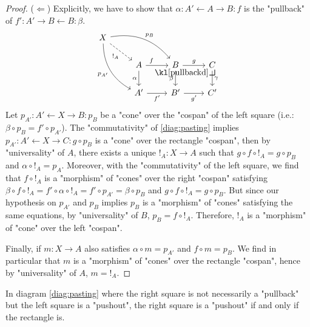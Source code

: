 \documentclass[main.tex]{subfiles}
\begin{document}
\begin{proof}
    ($\Leftarrow$) Explicitly, we have to show that $\alpha: A' \leftarrow A \rightarrow B: f$ is the "pullback" of $f': A' \rightarrow B \leftarrow B: \beta$. 
    \begin{equation}
    \begin{tikzcd}
X \arrow[rdd, "p_{A'}"', bend right] \arrow[rd, "{!}_A"', dashed] \arrow[rrd, "p_B", bend left] &                     &                                            &            \\
                                               & A \arrow[r, "f", near start] \arrow[d, "\alpha"'] & B \arrow[r, "g"] \arrow[d, "\beta"'] \arrow[rd, "\pullbackd", phantom, very near start] & C \arrow[d, "\gamma"] \\
                                               & A' \arrow[r, "f'"']                & B' \arrow[r, "g'"']                                  & C'          
\end{tikzcd}
    \end{equation}
    Let $p_{A'} : A' \leftarrow X \rightarrow B: p_B$ be a "cone" over the "cospan" of the left square (i.e.: $\beta \circ p_B = f' \circ p_{A'}$). The "commutativity" of \eqref{diag:pasting} implies $p_{A'}: A' \leftarrow X \rightarrow C: g \circ p_B$ is a "cone" over the rectangle "cospan", then by "universality" of $A$, there exists a unique ${!}_A: X \rightarrow A$ such that $g \circ f \circ {!}_A =  g \circ p_B$ and $\alpha \circ {!}_A = p_A$. Moreover, with the "commutativity" of the left square, we find that $f \circ {!}_A$ is a "morphism" of "cones" over the right "cospan" satisfying $\beta \circ f \circ {!}_A = f' \circ \alpha \circ {!}_A = f'\circ p_{A'} = \beta \circ p_B$ and $g \circ f \circ {!}_A = g \circ p_B$. But since our hypothesis on $p_{A'}$ and $p_B$ implies $p_B$ is a "morphism" of "cones" satisfying the same equations, by "universality" of $B$, $p_B = f \circ {!}_A$. Therefore, ${!}_A$ is a "morphism" of "cone" over the left "cospan".
    
    Finally, if $m: X \rightarrow A$ also satisfies $\alpha \circ m = p_{A'}$ and $f \circ m = p_B$. We find in particular that $m$ is a "morphism" of "cones" over the rectangle "cospan", hence by "universality" of $A$, $m = {!}_A$.
\end{proof}
\begin{cor}%
    In diagram \eqref{diag:pasting} where the right square is not necessarily a "pullback" but the left square is a "pushout", the right square is a "pushout" if and only if the rectangle is.
\end{cor}
\end{document}
